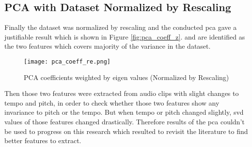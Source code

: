 \subsection{PCA with Dataset Normalized by Rescaling}

Finally the dataset was normalized by rescaling and the conducted \ac{pca} gave a justifiable result
which is shown in Figure \ref{fig:pca_coeff_z}.  and  are identified as the two features which covers majority of the variance
in the dataset. 

\begin{figure}[H]
    \centering
    \texttt{[image: pca\_coeff\_re.png]}
    \caption{PCA coefficients weighted by eigen values (Normalized by Rescaling)}
    \label{fig:pca_coeff_re}
\end{figure}

Then those two features were extracted from audio clips with slight changes to tempo and pitch, in order 
to check whether those two features show any invariance to pitch or the tempo. But when tempo or pitch changed
slightly, \ac{svd} values of those features changed drastically. Therefore results of the \ac{pca} couldn't
be used to progress on this research which resulted to revisit the literature to find better features to 
extract. 